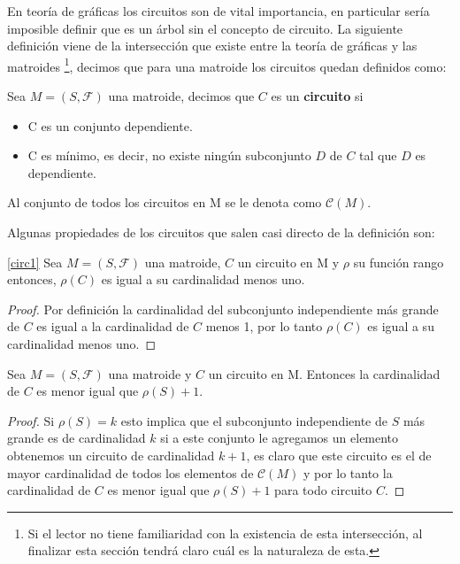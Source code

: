 En teoría de gráficas los circuitos son de vital importancia, en particular sería imposible definir que es un árbol sin el concepto de circuito. La siguiente definición viene de la intersección que existe entre la teoría de gráficas y las matroides \footnote{Si el lector no tiene familiaridad con la existencia de esta intersección, al finalizar esta sección tendrá claro cuál es la naturaleza de esta.}, decimos que para una matroide los circuitos quedan definidos como: 

\begin{dfn} %
Sea $M=(S,\mathcal{F})$ una matroide, decimos que $C$ es un \textbf{circuito} si 
\begin{itemize}
\item C es un conjunto dependiente. 
\item C es mínimo, es decir, no existe ningún subconjunto $D$ de $C$ tal que $D$ es dependiente.
\end{itemize}
Al conjunto de todos los circuitos en M se le denota como $\mathcal{C}(M)$.
\end{dfn}

Algunas propiedades de los circuitos que salen casi directo de la definición son: 

\begin{cor} \ref{circ1}
Sea $M=(S,\mathcal{F})$ una matroide, $C$ un circuito en M y $\rho$ su función rango entonces, $\rho(C)$ es igual a su cardinalidad menos uno. 
\end{cor}
\begin{proof}
Por definición la cardinalidad del subconjunto independiente más grande de $C$ es igual a la cardinalidad de $C$ menos 1, por lo tanto $\rho(C)$ es igual a su cardinalidad menos uno.
\end{proof}

\begin{cor}
Sea $M=(S,\mathcal{F})$ una matroide y $C$ un circuito en M. Entonces la cardinalidad de $C$ es menor igual que $\rho(S) + 1$.
\end{cor}

\begin{proof}
Si $\rho(S)=k$ esto implica que el subconjunto independiente de $S$ más grande es de cardinalidad $k$ si a este conjunto le agregamos un elemento obtenemos un circuito de cardinalidad $k +1$, es claro que este circuito es el de mayor cardinalidad de todos los elementos de $\mathcal{C}(M)$ y por lo tanto la cardinalidad de $C$ es menor igual que $\rho(S) + 1$ para todo circuito $C$.
\end{proof}

